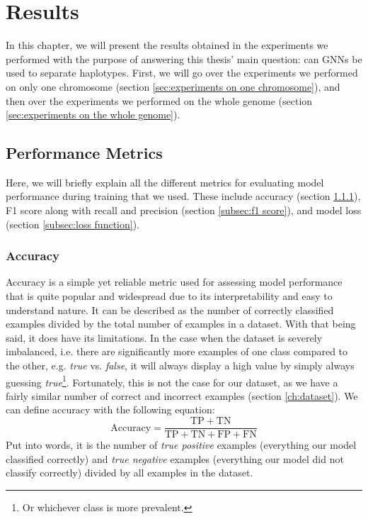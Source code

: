 \documentclass[times, utf8, diplomski, english]{fer_eng}
\begin{document}
\chapter{Results}
\label{ch:results}

In this chapter, we will present the results obtained in the experiments we performed with the purpose of answering this thesis' main question: can GNNs be used to separate haplotypes. First, we will go over the experiments we performed on only one chromosome (section \ref{sec:experiments on one chromosome}), and then over the experiments we performed on the whole genome (section \ref{sec:experiments on the whole genome}).

\section{Performance Metrics}

Here, we will briefly explain all the different metrics for evaluating model performance during training that we used. These include accuracy (section \ref{subsec:accuracy}), F1 score along with recall and precision (section \ref{subsec:f1 score}), and model loss (section \ref{subsec:loss function}).

\subsection{Accuracy}
\label{subsec:accuracy}

Accuracy is a simple yet reliable metric used for assessing model performance that is quite popular and widespread due to its interpretability and easy to understand nature. It can be described as the number of correctly classified examples divided by the total number of examples in a dataset. With that being said, it does have its limitations. In the case when the dataset is severely imbalanced, i.e. there are significantly more examples of one class compared to the other, e.g. \textit{true} vs. \textit{false}, it will always display a high value by simply always guessing \textit{true}\footnote{Or whichever class is more prevalent.}. Fortunately, this is not the case for our dataset, as we have a fairly similar number of correct and incorrect examples (section \ref{ch:dataset}). We can define accuracy with the following equation:
\[ \mathrm{Accuracy} = \frac{\mathrm{TP} + \mathrm{TN}}{\mathrm{TP} + \mathrm{TN} + \mathrm{FP} + \mathrm{FN}} \]
Put into words, it is the number of \textit{true positive} examples (everything our model classified correctly) and \textit{true negative} examples (everything our model did not classify correctly) divided by all examples in the dataset.
\end{document}
